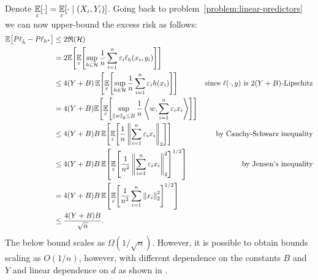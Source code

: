 \documentclass[main.tex]{subfiles}
\begin{document}
Denote $\underset{{\varepsilon}}{\mathbb{E}}\!\left[{\cdot}\right]
= \underset{{\varepsilon}}{\mathbb{E}}\!\left[{\cdot \mid (X_{i}, Y_{i})}\right]$.
Going back to problem~\ref{problem:linear-predictors} we can now upper-bound
the excess risk as follows:
\begin{align}
  \ex{P\ell_{\hat{h}} - P\ell_{h^{\star}}}
  &\leq 2 \mathfrak{R}(\mathcal{H}) \notag \\
  &= 2 \ex{
    \exd{\varepsilon}{\sup_{h \in \mathcal{H}}
      \frac{1}{n} \sum_{i=1}^{n} \varepsilon_{i} \ell_{h}(x_{i}, y_{i})
    }
  } \notag \\
  &\leq 4(Y + B)\, \ex{
    \exd{\varepsilon}{\sup_{h \in \mathcal{H}}
      \frac{1}{n} \sum_{i=1}^{n} \varepsilon_{i} h(x_{i})
    }
  } & \text{since $\ell(\cdot, y)$ is $2(Y + B)$-Lipschitz} \notag \\
  &= 4(Y + B) \ex{
    \exd{\varepsilon}{\sup_{\norm{w}_{2} \leq B}
      \frac{1}{n} \ip{w}{\sum_{i=1}^{n} \varepsilon_{i}x_{i}}
    }
  } \notag \\
  &\leq 4(Y+B)B\, \ex{
    \exd{\varepsilon}{
      \frac{1}{n} \norm{\sum_{i=1}^{n} \varepsilon_{i}x_{i}}_{2}
    }
  } & \text{by Cauchy-Schwarz inequality} \notag \\
  &\leq 4(Y +B)B\, \ex{
    \exd{\varepsilon}{
      \frac{1}{n^{2}} \norm{\sum_{i=1}^{n} \varepsilon_{i}x_{i}}_{2}^{2}
    }^{1/2}
  } & \text{by Jensen's inequality} \notag \\
  &= 4(Y +B)B\, \ex{
    \exd{\varepsilon}{
      \frac{1}{n^{2}} \sum_{i=1}^{n} \norm{x_{i}}_{2}^{2}
    }^{1/2}
  } \notag \\
 &\leq \frac{4(Y+B)B}{\sqrt{n}}. \label{eq:rademacher-bound}
\end{align}
The below bound scales as $\Omega(1/\sqrt{n})$. However, it is possible to
obtain bounds scaling as $O(1/n)$, however, with different dependence on
the constants $B$ and $Y$ and linear dependence on $d$ as shown
in \citet{shamir2015sample}.
\end{document}
